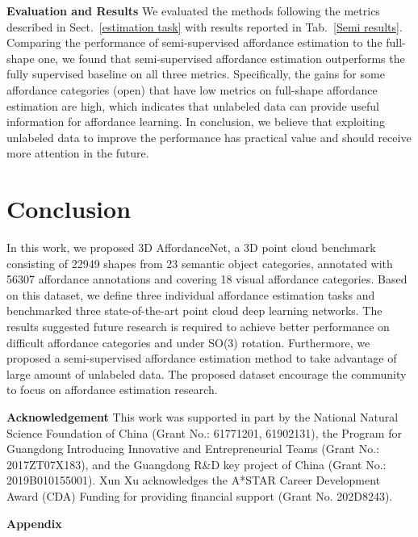 \documentclass[final]{cvpr}
\begin{document}
\noindent\textbf{Evaluation and Results} We evaluated the methods following the metrics described in Sect.~\ref{estimation task} with results reported in Tab.~\ref{Semi results}. Comparing the performance of semi-supervised affordance estimation to the full-shape one, we found that semi-supervised affordance estimation outperforms the fully supervised baseline on all three metrics. Specifically, the gains for some affordance categories (\eg open) that have low metrics on full-shape affordance estimation are high, which indicates that unlabeled data can provide useful information for affordance learning. In conclusion, we believe that exploiting unlabeled data to improve the performance has practical value and should receive more attention in the future.







\section{Conclusion}

In this work, we proposed 3D AffordanceNet, a 3D point cloud benchmark consisting of 22949 shapes from 23 semantic object categories, annotated with 56307 affordance annotations and covering 18 visual affordance categories. Based on this dataset, we define three individual affordance estimation tasks and benchmarked three state-of-the-art point cloud deep learning networks. The results suggested future research is required to achieve better performance on difficult affordance categories and under SO(3) rotation. Furthermore, we proposed a semi-supervised affordance estimation method to take advantage of large amount of unlabeled data. The proposed dataset encourage the community to focus on affordance estimation research.

\noindent\textbf{Acknowledgement} This work was supported in part by the National Natural Science Foundation of China (Grant No.: 61771201, 61902131), the Program for Guangdong Introducing Innovative and Entrepreneurial Teams (Grant No.: 2017ZT07X183), and the Guangdong R\&D key project of China (Grant No.: 2019B010155001). Xun Xu acknowledges the A*STAR Career Development Award (CDA) Funding for providing financial support (Grant No. 202D8243).
{\small


}

\clearpage
\textbf{\Large Appendix} \\
\appendix
\end{document}
